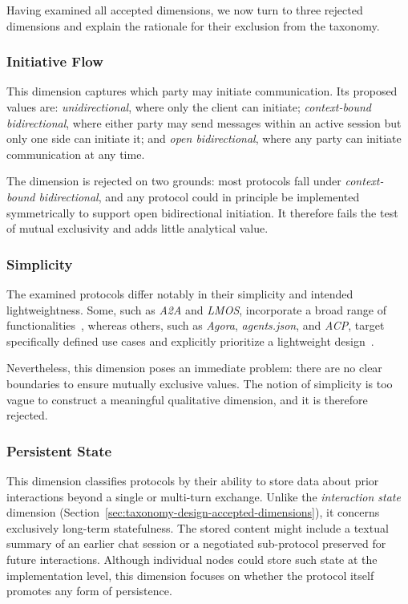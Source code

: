 \documentclass[pdflatex,sn-mathphys-num]{sn-jnl}%
\theoremstyle{thmstyleone}%
\theoremstyle{thmstyletwo}%
\theoremstyle{thmstylethree}%
\begin{document}
Having examined all accepted dimensions, we now turn to three rejected dimensions and explain the rationale for their exclusion from the taxonomy.

\subsubsection{Initiative Flow}

This dimension captures which party may initiate communication. Its proposed values are: \textit{unidirectional}, where only the client can initiate; \textit{context-bound bidirectional}, where either party may send messages within an active session but only one side can initiate it; and \textit{open bidirectional}, where any party can initiate communication at any time.

The dimension is rejected on two grounds: most protocols fall under \textit{context-bound bidirectional}, and any protocol could in principle be implemented symmetrically to support open bidirectional initiation. It therefore fails the test of mutual exclusivity and adds little analytical value.

\subsubsection{Simplicity} 

The examined protocols differ notably in their simplicity and intended lightweightness. Some, such as \textit{A2A} and \textit{LMOS}, incorporate a broad range of functionalities~\cite{a2adocsspecification,lmosintroduction}, whereas others, such as \textit{Agora}, \textit{agents.json}, and \textit{ACP}, target specifically defined use cases and explicitly prioritize a lightweight design~\cite{agoraspecification,agentsjsonintro,acpcoreconcepts}.

Nevertheless, this dimension poses an immediate problem: there are no clear boundaries to ensure mutually exclusive values. The notion of simplicity is too vague to construct a meaningful qualitative dimension, and it is therefore rejected.

\subsubsection{Persistent State}

This dimension classifies protocols by their ability to store data about prior interactions beyond a single or multi-turn exchange. Unlike the \textit{interaction state} dimension (Section~\ref{sec:taxonomy-design-accepted-dimensions}), it concerns exclusively long-term statefulness. The stored content might include a textual summary of an earlier chat session or a negotiated sub-protocol preserved for future interactions. Although individual nodes could store such state at the implementation level, this dimension focuses on whether the protocol itself promotes any form of persistence.
\end{document}
